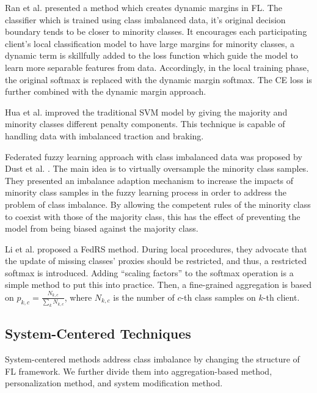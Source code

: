 \documentclass[10pt,journal,compsoc]{IEEEtran}
\begin{document}
Ran et al. \cite{ran2021dynamic} presented a method which creates dynamic margins in FL. The classifier which is trained using class imbalanced data, it's original decision boundary tends to be closer to minority classes. It encourages each participating client's local classification model to have large margins for minority classes, a dynamic term is skillfully added to the loss function which guide the model to learn more separable features from data.  Accordingly, in the local training phase, the original softmax is replaced with the dynamic margin softmax. The CE loss is further combined with the dynamic margin approach.

Hua et al. \cite{hua2020blockchain} improved the traditional SVM model by giving the majority and minority classes different penalty components. This technique is capable of handling data with imbalanced traction and braking. 

Federated fuzzy learning approach with class imbalanced data was proposed by Dust et al. \cite{dust2021federated}. The main idea is to virtually oversample the minority class samples.  They presented an imbalance adaption mechanism to increase the impacts of minority class samples in the fuzzy learning process in order to address the problem of class imbalance. By allowing the competent rules of the minority class to coexist with those of the majority class, this has the effect of preventing the model from being biased against the majority class. 

Li et al. proposed  \cite{li2021fedrs} a FedRS method. During local procedures, they advocate that the update of missing classes’ proxies should be restricted, and thus, a restricted softmax is introduced. Adding ``scaling factors'' to the softmax operation is a simple method to put this into practice. Then, a fine-grained aggregation is based on $p_{k,c}=\frac{N_{k,c}}{ {\textstyle \sum_{k}^{}} N_{k,c}}$, where $N_{k,c}$ is the number of $ c $-th class samples on $ k $-th client. 
\vspace{-0.2cm}

\subsection{System-Centered Techniques}
System-centered methods address class imbalance by changing the structure of FL framework. We further divide them into aggregation-based method, personalization method, and system modification method.
\vspace{-0.2cm}
\end{document}
